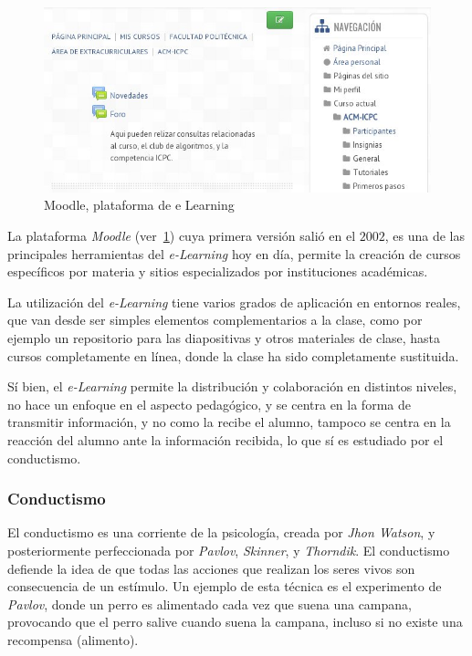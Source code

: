 \begin{figure}[h] 
\centering 
\includegraphics[scale=0.5]{tics/images/moodle.jpg}
\caption{Moodle, plataforma de e Learning} 
\label{fig:moodle}
\end{figure}


La plataforma \emph{Moodle} (ver~\ref{fig:moodle}) cuya primera versión salió en
el $2002$, es una de las principales herramientas del \emph{e-Learning} hoy en
día, permite la creación de cursos específicos por materia y sitios
especializados por instituciones académicas\cite{perkins2006using}. 

La utilización del \emph{e-Learning} tiene varios grados de aplicación en
entornos reales\cite{punie:ict}, que van desde ser simples elementos
complementarios a la clase, como por ejemplo un repositorio para las
diapositivas y otros materiales de clase, hasta cursos completamente en línea,
donde la clase ha sido completamente sustituida.

Sí bien, el \emph{e-Learning} permite la distribución y colaboración en
distintos niveles, no hace un enfoque en el aspecto pedagógico, y se centra en
la forma de transmitir información, y no como la recibe el
alumno\cite{leinonen:ict}, tampoco se centra en la reacción del alumno ante la
información recibida, lo que sí es estudiado por el
conductismo\cite{weegar2012comparison}.

\subsubsection{Conductismo}

El conductismo es una corriente de la psicología, creada por \textit{Jhon
    Watson}, y posteriormente perfeccionada por \textit{Pavlov},
\textit{Skinner}, y \textit{Thorndik}. El conductismo defiende la idea de que
todas las acciones que realizan los seres vivos son consecuencia de un
estímulo. Un ejemplo de esta técnica es el experimento de \textit{Pavlov},
donde un perro es alimentado cada vez que suena una campana, provocando que el
perro salive cuando suena la campana, incluso si no existe una recompensa
(alimento)\cite{weegar2012comparison}.

